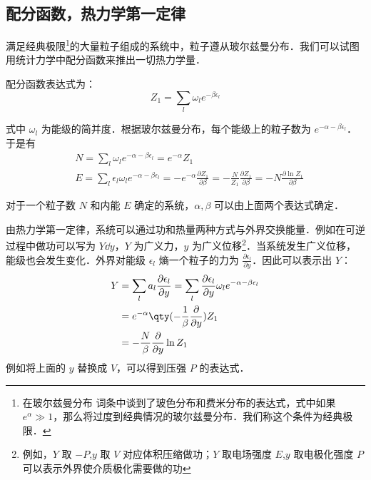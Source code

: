 

\subsection{配分函数，热力学第一定律}

满足经典极限\footnote{在玻尔兹曼分布 词条中谈到了玻色分布和费米分布的表达式，式中如果 $e^\alpha\gg 1$，那么将过度到经典情况的玻尔兹曼分布．我们称这个条件为经典极限．}的大量粒子组成的系统中，粒子遵从玻尔兹曼分布．我们可以试图用统计力学中配分函数来推出一切热力学量．

配分函数表达式为：
\begin{equation}
Z_1=\sum_l \omega_l e^{-\beta \epsilon_l}
\end{equation}

式中 $\omega_l$ 为能级的简并度．根据玻尔兹曼分布，每个能级上的粒子数为 $e^{-\alpha-\beta\epsilon_l}$．于是有
\begin{equation}\label{TheSta_eq4}
\begin{aligned}
&N=\sum_l \omega_l e^{-\alpha-\beta\epsilon_l}=e^{-\alpha} Z_1\\
&E=\sum_l \epsilon_l \omega_l e^{-\alpha-\beta\epsilon_l}=-e^{-\alpha}\frac{\partial Z_1}{\partial \beta}=-\frac{N}{Z_1}\frac{\partial Z_1}{\partial \beta}=-N\frac{\partial \ln Z_1}{\partial \beta}
\end{aligned}
\end{equation}

对于一个粒子数 $N$ 和内能 $E$ 确定的系统，$\alpha,\beta$ 可以由上面两个表达式确定．

由热力学第一定律，系统可以通过功和热量两种方式与外界交换能量．例如在可逆过程中做功可以写为 $Y\dd y$，$Y$ 为广义力，$y$ 为广义位移\footnote{例如，$Y$ 取 $-P$,$y$ 取 $V$ 对应体积压缩做功；$Y$ 取电场强度 $E$,$y$ 取电极化强度 $P$ 可以表示外界使介质极化需要做的功}．当系统发生广义位移，能级也会发生变化．外界对能级 $\epsilon_l$ 熵一个粒子的力为 $\frac{\partial \epsilon_l}{\partial y}$．因此可以表示出 $Y$：
\begin{equation}
\begin{aligned}
Y&=\sum_l a_l\frac{\partial \epsilon_l}{\partial y}=\sum_l \frac{\partial \epsilon_l}{\partial y}\omega_le^{-\alpha-\beta\epsilon_l}\\
&=e^{-\alpha}\qty(-\frac{1}{\beta}\frac{\partial }{\partial y})Z_1\\
&=-\frac{N}{\beta}\frac{\partial }{\partial y}\ln Z_1
\end{aligned}
\end{equation}
例如将上面的 $y$ 替换成 $V$，可以得到压强 $P$ 的表达式．

